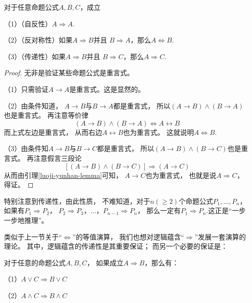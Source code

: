 \begin{thm}[逻辑蕴含是偏序关系]
对于任意命题公式$A,B,C$，成立

（1）（自反性）$A\Rightarrow A$.

（2）（反对称性）如果$A\Rightarrow B$并且
$B\Rightarrow A$，那么$A\Leftrightarrow B$.

（3）（传递性）如果$A\Rightarrow B$并且
$B\Rightarrow C$，那么$A\Rightarrow C$.
\label{logic imply-partial order}
\end{thm}

\begin{proof}无非是验证某些命题公式是重言式。

（1）只需验证$A\rightarrow A$是重言式。这是显然的。

（2）由条件知道，
$A\rightarrow B$与$B\rightarrow A$都是重言式，
所以$(A\rightarrow B)\wedge(B\rightarrow A)$也是重言式。
再注意等价律
$$(A\rightarrow B)\wedge(B\rightarrow A)
\Leftrightarrow A\leftrightarrow B$$
而上式左边是重言式，
从而右边$A\leftrightarrow B$也为重言式。
这就说明$A\Leftrightarrow B$.

（3）由条件知$A\rightarrow B$与$B\rightarrow C$都是重言式，
所以$(A\rightarrow B)\wedge(B\rightarrow C)$也是重言式。
再注意假言三段论
$$[(A\rightarrow B)\wedge(B\rightarrow C)]
\Rightarrow(A\rightarrow C)$$
从而由引理\ref{luoji-yunhan-lemma}可知，
$A\rightarrow C$也为重言式，
也就是说$A\Rightarrow C$，得证。
\end{proof}

特别注意到传递性，由此性质，
不难知道，对于$n(\geq 2)$个命题公式$P_1,...,P_n$，
如果有$P_1\Rightarrow P_2$，
$P_2\Rightarrow P_3$，...，$P_{n-1}\Rightarrow P_n$，
那么一定有$P_1\Rightarrow P_n$.这正是“一步一步地推理”。\vs

类似于上一节关于“$\Leftrightarrow$”的等值演算，
我们也想对逻辑蕴含“$\Rightarrow$”发展一套演算的理论。
其中，逻辑蕴含的传递性是其重要保证；
而另一个必要的保证是：

\begin{thm}[逻辑蕴含的置换规则]
\label{逻辑蕴含的置换规则}
对于任意的命题公式$A,B,C$，
如果成立$A\Rightarrow B$，那么有：

（1）$A\vee C\Rightarrow B\vee C$

（2）$A\wedge C\Rightarrow B\wedge C$
\end{thm}

